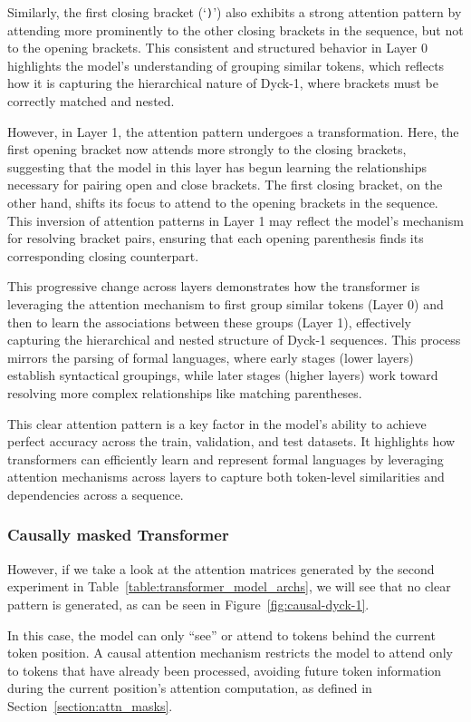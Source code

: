 Similarly, the first closing bracket (`\verb|)|') also exhibits a strong attention pattern by attending more prominently to the other closing brackets in the sequence, but not to the opening brackets. This consistent and structured behavior in Layer 0 highlights the model's understanding of grouping similar tokens, which reflects how it is capturing the hierarchical nature of Dyck-1, where brackets must be correctly matched and nested.

However, in Layer 1, the attention pattern undergoes a transformation. Here, the first opening bracket now attends more strongly to the closing brackets, suggesting that the model in this layer has begun learning the relationships necessary for pairing open and close brackets. The first closing bracket, on the other hand, shifts its focus to attend to the opening brackets in the sequence. This inversion of attention patterns in Layer 1 may reflect the model's mechanism for resolving bracket pairs, ensuring that each opening parenthesis finds its corresponding closing counterpart.

This progressive change across layers demonstrates how the transformer is leveraging the attention mechanism to first group similar tokens (Layer 0) and then to learn the associations between these groups (Layer 1), effectively capturing the hierarchical and nested structure of Dyck-1 sequences. This process mirrors the parsing of formal languages, where early stages (lower layers) establish syntactical groupings, while later stages (higher layers) work toward resolving more complex relationships like matching parentheses.

This clear attention pattern is a key factor in the model’s ability to achieve perfect accuracy across the train, validation, and test datasets. It highlights how transformers can efficiently learn and represent formal languages by leveraging attention mechanisms across layers to capture both token-level similarities and dependencies across a sequence.

\subsubsection{Causally masked Transformer} \label{subsubsection:causal-dyck-1}
However, if we take a look at the attention matrices generated by the second experiment in Table~\ref{table:transformer_model_archs}, we will see that no clear pattern is generated, as can be seen in Figure~\ref{fig:causal-dyck-1}.

In this case, the model can only ``see'' or attend to tokens behind the current token position. A causal attention mechanism restricts the model to attend only to tokens that have already been processed, avoiding future token information during the current position's attention computation, as defined in Section~\ref{section:attn_masks}.

